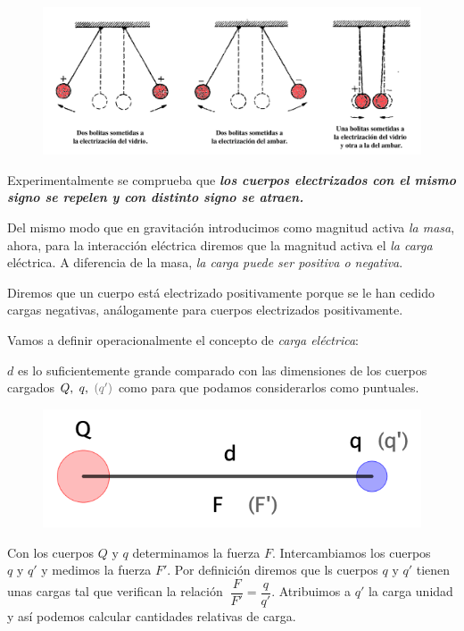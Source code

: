 \begin{figure}[H]
		\centering
		\includegraphics[width=1\textwidth]{imagenes/imagenes22/T22IM04.png}
	\end{figure}

\begin{miparrafodestacado}
Experimentalmente se comprueba que \textbf{\emph{los cuerpos electrizados con el mismo signo se repelen y con distinto signo se atraen.}}
\end{miparrafodestacado}

Del mismo modo que en gravitación introducimos como magnitud activa \emph{la masa}, ahora, para la interacción eléctrica diremos que la magnitud activa el \emph{la carga} eléctrica. A diferencia de la masa, \emph{la carga puede ser positiva o negativa}.

Diremos que un cuerpo está electrizado positivamente porque se le han cedido cargas negativas, análogamente para cuerpos electrizados positivamente. 

Vamos a definir operacionalmente el concepto de \emph{carga eléctrica}:

\begin{multicols}{2}
$d$ es lo suficientemente grande comparado con las dimensiones de los cuerpos cargados $Q, \ q,\ \textcolor{gris}{(q')}$ como para que podamos considerarlos  como puntuales.

\begin{figure}[H]
		\centering
		\includegraphics[width=.5\textwidth]{imagenes/imagenes22/T22IM05.png}
	\end{figure}	
\end{multicols}
Con los cuerpos $Q \text{ y } q$ determinamos la fuerza $F$. Intercambiamos los cuerpos $q \text{ y } q'$ y medimos la fuerza $F'$. Por definición diremos que ls cuerpos  $q \text{ y } q'$ tienen unas cargas tal que verifican la relación $\ \dfrac F {F'}=\dfrac q {q'}$. Atribuimos a $q'$ la carga unidad y así podemos calcular cantidades relativas de carga.

